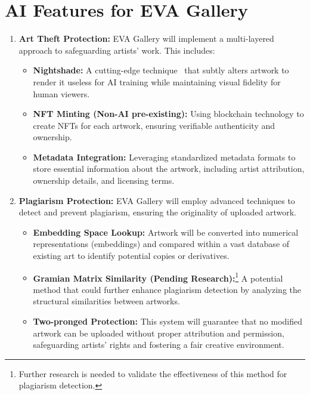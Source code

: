 \section{AI Features for EVA Gallery}

\begin{enumerate}
\item \textbf{Art Theft Protection:} EVA Gallery will implement a multi-layered approach to safeguarding artists' work. This includes:

    \begin{itemize}
        \item \textbf{Nightshade:} A cutting-edge technique~\cite{shan2024nightshade} that subtly alters artwork to render it useless for AI training while maintaining visual fidelity for human viewers.
        \item \textbf{NFT Minting (Non-AI pre-existing):} Using blockchain technology to create NFTs for each artwork, ensuring verifiable authenticity and ownership.
        \item \textbf{Metadata Integration:} Leveraging standardized metadata formats to store essential information about the artwork, including artist attribution, ownership details, and licensing terms.
    \end{itemize}

\item \textbf{Plagiarism Protection:} EVA Gallery will employ advanced techniques to detect and prevent plagiarism, ensuring the originality of uploaded artwork.

    \begin{itemize}
        \item \textbf{Embedding Space Lookup:} Artwork will be converted into numerical representations (embeddings) and compared within a vast database of existing art to identify potential copies or derivatives.
        \item \textbf{Gramian Matrix Similarity (Pending Research):}\footnote{Further research is needed to validate the effectiveness of this method for plagiarism detection.} A potential method that could further enhance plagiarism detection by analyzing the structural similarities between artworks.
        \item \textbf{Two-pronged Protection:} This system will guarantee that no modified artwork can be uploaded without proper attribution and permission, safeguarding artists' rights and fostering a fair creative environment.
    \end{itemize}


\end{enumerate}
